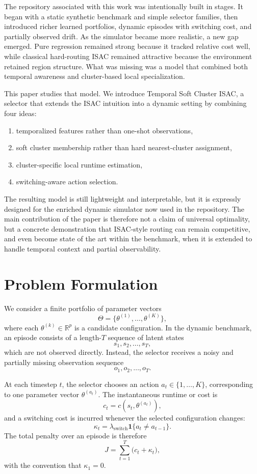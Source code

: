\documentclass[conference]{IEEEtran}
\begin{document}
The repository associated with this work was intentionally built in stages. It began with a static synthetic benchmark and simple selector families, then introduced richer learned portfolios, dynamic episodes with switching cost, and partially observed drift. As the simulator became more realistic, a new gap emerged. Pure regression remained strong because it tracked relative cost well, while classical hard-routing ISAC remained attractive because the environment retained region structure. What was missing was a model that combined both temporal awareness and cluster-based local specialization.

This paper studies that model. We introduce Temporal Soft Cluster ISAC, a selector that extends the ISAC intuition into a dynamic setting by combining four ideas:
\begin{enumerate}
\item temporalized features rather than one-shot observations,
\item soft cluster membership rather than hard nearest-cluster assignment,
\item cluster-specific local runtime estimation,
\item switching-aware action selection.
\end{enumerate}

The resulting model is still lightweight and interpretable, but it is expressly designed for the enriched dynamic simulator now used in the repository. The main contribution of the paper is therefore not a claim of universal optimality, but a concrete demonstration that ISAC-style routing can remain competitive, and even become state of the art within the benchmark, when it is extended to handle temporal context and partial observability.

\section{Problem Formulation}

We consider a finite portfolio of parameter vectors
\[
\Theta = \{\theta^{(1)}, \dots, \theta^{(K)}\},
\]
where each $\theta^{(k)} \in \mathbb{R}^p$ is a candidate configuration. In the dynamic benchmark, an episode consists of a length-$T$ sequence of latent states
\[
s_1, s_2, \dots, s_T,
\]
which are not observed directly. Instead, the selector receives a noisy and partially missing observation sequence
\[
o_1, o_2, \dots, o_T.
\]

At each timestep $t$, the selector chooses an action $a_t \in \{1,\dots,K\}$, corresponding to one parameter vector $\theta^{(a_t)}$. The instantaneous runtime or cost is
\[
c_t = c(s_t, \theta^{(a_t)}),
\]
and a switching cost is incurred whenever the selected configuration changes:
\[
\kappa_t = \lambda_{\mathrm{switch}} \mathbf{1}\{a_t \neq a_{t-1}\}.
\]
The total penalty over an episode is therefore
\[
J = \sum_{t=1}^T \bigl(c_t + \kappa_t\bigr),
\]
with the convention that $\kappa_1 = 0$.
\end{document}
